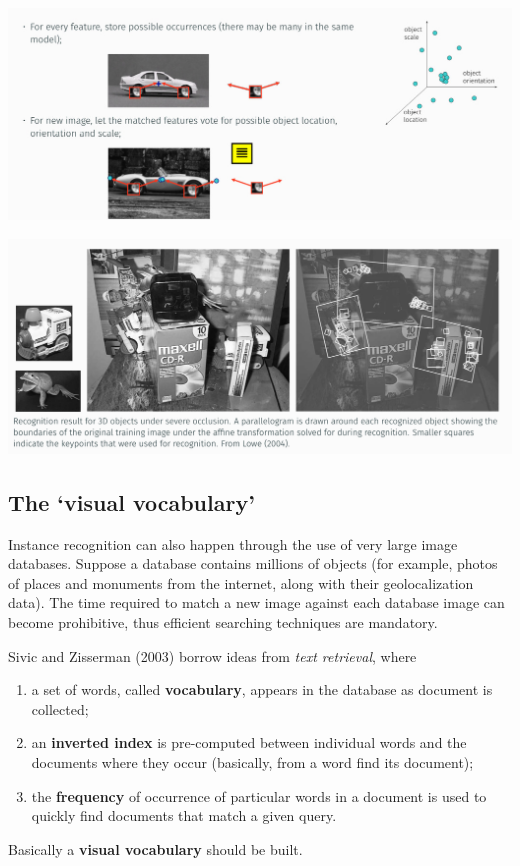 \documentclass[10pt]{report}
\begin{document}
\begin{center}
\includegraphics[width=.9\linewidth]{./pics/recog/ght-1.jpg}
\end{center}

\begin{center}
\includegraphics[width=.9\linewidth]{./pics/recog/ght-2.jpg}
\end{center}

\subsection{The `visual vocabulary'}
\label{sec:orgbf7d648}
Instance recognition can also happen through the use of very large image databases. Suppose a database contains millions of objects (for example, photos of places and monuments from the internet, along with their geolocalization data). The time required to match a new image against each database image can become prohibitive, thus efficient searching techniques are mandatory.

Sivic and Zisserman (2003) borrow ideas from \emph{text retrieval}, where
\begin{enumerate}
\item a set of words, called \textbf{vocabulary}, appears in the database as document is collected;
\item an \textbf{inverted index} is pre\--computed between individual words and the documents where they occur (basically, from a word find its document);
\item the \textbf{frequency} of occurrence of particular words in a document is used to quickly find documents that match a given query.
\end{enumerate}
Basically a \textbf{visual vocabulary} should be built.
\end{document}
